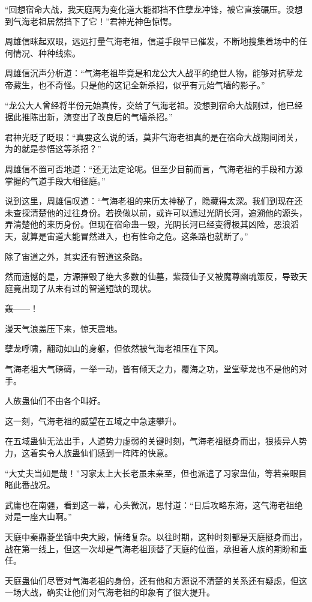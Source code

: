 \begin{this_body}
“回想宿命大战，我天庭两为变化道大能都挡不住孽龙冲锋，被它直接碾压。没想到气海老祖居然挡下了它！”君神光神色惊愕。

周雄信眯起双眼，远远打量气海老祖，信道手段早已催发，不断地搜集着场中的任何情况、种种线索。

周雄信沉声分析道：“气海老祖毕竟是和龙公大人战平的绝世人物，能够对抗孽龙帝藏生，也不奇怪。只是他的这记全新杀招，似乎有元始气墙的影子。”

“龙公大人曾经将半份元始真传，交给了气海老祖。没想到宿命大战刚过，他已经据此推陈出新，演变出了改良后的气墙杀招。”

君神光眨了眨眼：“真要这么说的话，莫非气海老祖真的是在宿命大战期间闭关，为的就是参悟这等杀招？”

周雄信不置可否地道：“还无法定论呢。但至少目前而言，气海老祖的手段和方源掌握的气道手段大相径庭。”

说到这里，周雄信叹道：“气海老祖的来历太神秘了，隐藏得太深。我们到现在还未查探清楚他的过往身份。若换做以前，或许可以通过光阴长河，追溯他的源头，弄清楚他的来历身份。但现在宿命蛊一毁，光阴长河已经变得极其凶险，恶浪滔天，就算是宙道大能冒然进入，也有性命之危。这条路也就断了。”

除了宙道之外，其实还有智道这条路。

然而遗憾的是，方源摧毁了绝大多数的仙墓，紫薇仙子又被魔尊幽魂策反，导致天庭竟出现了从未有过的智道短缺的现状。

轰——！

漫天气浪盖压下来，惊天震地。

孽龙呼啸，翻动如山的身躯，但依然被气海老祖压在下风。

气海老祖大气磅礴，一举一动，皆有倾天之力，覆海之功，堂堂孽龙也不是他的对手。

人族蛊仙们不由各个叫好。

这一刻，气海老祖的威望在五域之中急速攀升。

在五域蛊仙无法出手，人道势力虚弱的关键时刻，气海老祖挺身而出，狠揍异人势力，这着实令人族蛊仙们感到一阵阵的快意。

“大丈夫当如是哉！”习家太上大长老虽未亲至，但也派遣了习家蛊仙，等若亲眼目睹此番战况。

武庸也在南疆，看到这一幕，心头微沉，思忖道：“日后攻略东海，这气海老祖绝对是一座大山啊。”

天庭中秦鼎菱坐镇中央大殿，情绪复杂。以往时期，这种时刻都是天庭挺身而出，战在第一线上，但这一次却是气海老祖顶替了天庭的位置，承担着人族的期盼和重任。

天庭蛊仙们尽管对气海老祖的身份，还有他和方源说不清楚的关系还有疑虑，但这一场大战，确实让他们对气海老祖的印象有了很大提升。


\end{this_body}
